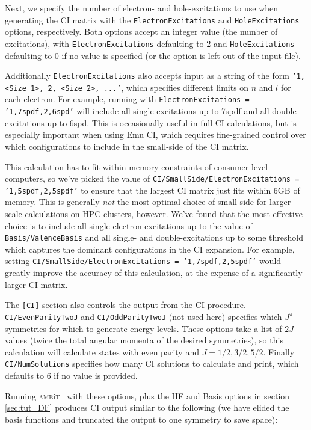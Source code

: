 \documentclass{report}
\newcommand{\ambit}{\textsc{amb}{\footnotesize i}\textsc{t}}
\begin{document}
Next, we specify the number of electron- and hole-excitations to use when generating the CI matrix with
the \texttt{ElectronExcitations} and \texttt{HoleExcitations} options, respectively. Both options accept
an integer value (the number of excitations), with \texttt{ElectronExcitations} defaulting to 2 and
\texttt{HoleExcitations} defaulting to 0 if no value is specified (or the option is left out of the
input file).

Additionally \texttt{ElectronExcitations} also accepts input as a string of the form 
\texttt{'1, <Size 1>, 2, <Size 2>, ...'}, which specifies different limits on $n$ and $l$ for each 
electron. For example, running with \texttt{ElectronExcitations = '1,7spdf,2,6spd'} will include all
single-excitations up to 7spdf and all double-excitations up to 6spd. This is occasionally useful in
full-CI calculations, but is especially important when using Emu CI, which requires fine-grained control
over which configurations to include in the small-side of the CI matrix. 

This calculation has to fit within memory constraints of consumer-level computers, so we've picked the
value of \texttt{CI/SmallSide/ElectronExcitations = '1,5spdf,2,5spdf'} to ensure that the largest CI 
matrix just fits within 6GB of memory. This is generally \emph{not} the most optimal choice of
small-side for larger-scale calculations on HPC clusters, however. We've found that the most effective
choice is to include all single-electron excitations up to the value of \texttt{Basis/ValenceBasis} and
all single- and double-excitations up to some threshold which captures the dominant configurations in
the CI expansion. For example, setting \texttt{CI/SmallSide/ElectronExcitations = '1,7spdf,2,5spdf'}
would greatly improve the accuracy of this calculation, at the expense of a significantly larger CI
matrix.

The \texttt{[CI]} section also controls the output from the CI procedure. \texttt{CI/EvenParityTwoJ} and
\texttt{CI/OddParityTwoJ} (not used here) specifies which $J^{\pi}$ symmetries for which to generate 
energy levels. These options take a list of $2J$-values (twice the total angular momenta of the desired
symmetries), so this calculation will calculate states with even parity and $J = 1/2, 3/2, 5/2$. Finally
\texttt{CI/NumSolutions} specifies how many CI solutions to calculate and print, which defaults to 6 if
no value is provided.

Running \ambit~ with these options, plus the HF and Basis options in section \ref{sec:tut_DF} produces
CI output similar to the following (we have elided the basis functions and truncated the output to one
symmetry to save space):
\end{document}
